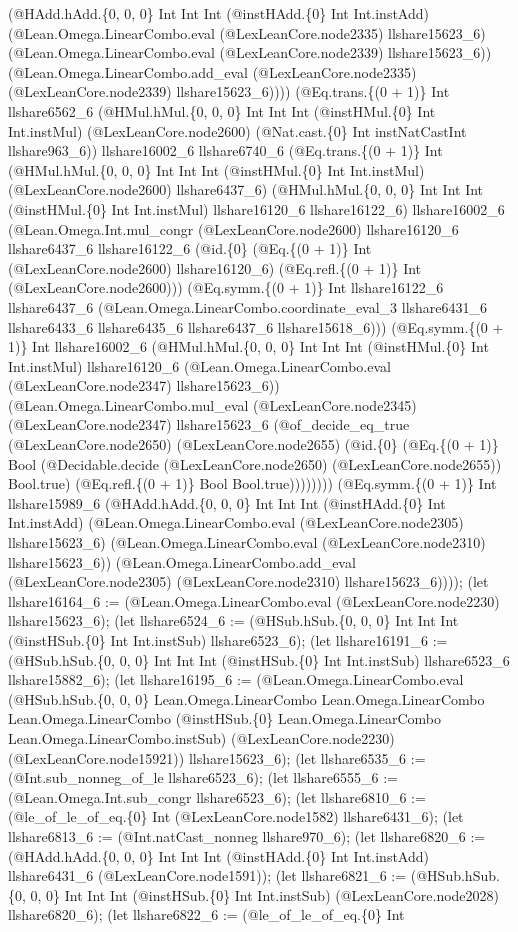 \documentclass[11pt]{article}
\begin{document}
(@HAdd.hAdd.\{0, 0, 0\} Int Int Int (@instHAdd.\{0\} Int Int.instAdd) (@Lean.Omega.LinearCombo.eval (@LexLeanCore.node2335) llshare15623\_6) (@Lean.Omega.LinearCombo.eval (@LexLeanCore.node2339) llshare15623\_6)) (@Lean.Omega.LinearCombo.add\_eval (@LexLeanCore.node2335) (@LexLeanCore.node2339) llshare15623\_6)))) (@Eq.trans.\{(0 + 1)\} Int llshare6562\_6 (@HMul.hMul.\{0, 0, 0\} Int Int Int (@instHMul.\{0\} Int Int.instMul) (@LexLeanCore.node2600) (@Nat.cast.\{0\} Int instNatCastInt llshare963\_6)) llshare16002\_6 llshare6740\_6 (@Eq.trans.\{(0 + 1)\} Int (@HMul.hMul.\{0, 0, 0\} Int Int Int (@instHMul.\{0\} Int Int.instMul) (@LexLeanCore.node2600) llshare6437\_6) (@HMul.hMul.\{0, 0, 0\} Int Int Int (@instHMul.\{0\} Int Int.instMul) llshare16120\_6 llshare16122\_6) llshare16002\_6 (@Lean.Omega.Int.mul\_congr (@LexLeanCore.node2600) llshare16120\_6 llshare6437\_6 llshare16122\_6 (@id.\{0\} (@Eq.\{(0 + 1)\} Int (@LexLeanCore.node2600) llshare16120\_6) (@Eq.refl.\{(0 + 1)\} Int (@LexLeanCore.node2600))) (@Eq.symm.\{(0 + 1)\} Int llshare16122\_6 llshare6437\_6 (@Lean.Omega.LinearCombo.coordinate\_eval\_3 llshare6431\_6 llshare6433\_6 llshare6435\_6 llshare6437\_6 llshare15618\_6))) (@Eq.symm.\{(0 + 1)\} Int llshare16002\_6 (@HMul.hMul.\{0, 0, 0\} Int Int Int (@instHMul.\{0\} Int Int.instMul) llshare16120\_6 (@Lean.Omega.LinearCombo.eval (@LexLeanCore.node2347) llshare15623\_6)) (@Lean.Omega.LinearCombo.mul\_eval (@LexLeanCore.node2345) (@LexLeanCore.node2347) llshare15623\_6 (@of\_decide\_eq\_true (@LexLeanCore.node2650) (@LexLeanCore.node2655) (@id.\{0\} (@Eq.\{(0 + 1)\} Bool (@Decidable.decide (@LexLeanCore.node2650) (@LexLeanCore.node2655)) Bool.true) (@Eq.refl.\{(0 + 1)\} Bool Bool.true)))))))) (@Eq.symm.\{(0 + 1)\} Int llshare15989\_6 (@HAdd.hAdd.\{0, 0, 0\} Int Int Int (@instHAdd.\{0\} Int Int.instAdd) (@Lean.Omega.LinearCombo.eval (@LexLeanCore.node2305) llshare15623\_6) (@Lean.Omega.LinearCombo.eval (@LexLeanCore.node2310) llshare15623\_6)) (@Lean.Omega.LinearCombo.add\_eval (@LexLeanCore.node2305) (@LexLeanCore.node2310) llshare15623\_6)))); (let llshare16164\_6 := (@Lean.Omega.LinearCombo.eval (@LexLeanCore.node2230) llshare15623\_6); (let llshare6524\_6 := (@HSub.hSub.\{0, 0, 0\} Int Int Int (@instHSub.\{0\} Int Int.instSub) llshare6523\_6); (let llshare16191\_6 := (@HSub.hSub.\{0, 0, 0\} Int Int Int (@instHSub.\{0\} Int Int.instSub) llshare6523\_6 llshare15882\_6); (let llshare16195\_6 := (@Lean.Omega.LinearCombo.eval (@HSub.hSub.\{0, 0, 0\} Lean.Omega.LinearCombo Lean.Omega.LinearCombo Lean.Omega.LinearCombo (@instHSub.\{0\} Lean.Omega.LinearCombo Lean.Omega.LinearCombo.instSub) (@LexLeanCore.node2230) (@LexLeanCore.node15921)) llshare15623\_6); (let llshare6535\_6 := (@Int.sub\_nonneg\_of\_le llshare6523\_6); (let llshare6555\_6 := (@Lean.Omega.Int.sub\_congr llshare6523\_6); (let llshare6810\_6 := (@le\_of\_le\_of\_eq.\{0\} Int (@LexLeanCore.node1582) llshare6431\_6); (let llshare6813\_6 := (@Int.natCast\_nonneg llshare970\_6); (let llshare6820\_6 := (@HAdd.hAdd.\{0, 0, 0\} Int Int Int (@instHAdd.\{0\} Int Int.instAdd) llshare6431\_6 (@LexLeanCore.node1591)); (let llshare6821\_6 := (@HSub.hSub.\{0, 0, 0\} Int Int Int (@instHSub.\{0\} Int Int.instSub) (@LexLeanCore.node2028) llshare6820\_6); (let llshare6822\_6 := (@le\_of\_le\_of\_eq.\{0\} Int 
\end{document}
